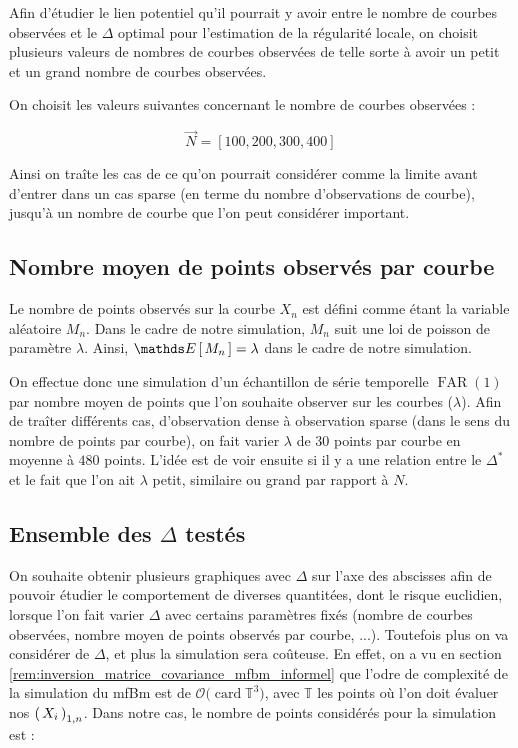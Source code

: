 Afin d'étudier le lien potentiel qu'il pourrait y avoir entre le nombre de courbes observées et le $\Delta$ optimal pour l'estimation de la régularité locale, on choisit plusieurs valeurs de nombres de courbes observées de telle sorte à avoir un \og petit \fg et un \og grand \fg nombre de courbes observées.

On choisit les valeurs suivantes concernant le nombre de courbes observées :

$$
	\vec N = [ 100, 200, 300, 400]
$$

Ainsi on traîte les cas de ce qu'on pourrait considérer comme la limite avant d'entrer dans un cas \og sparse \fg (en terme du nombre d'observations de courbe), jusqu'à un nombre de courbe que l'on peut considérer important.

\subsection{Nombre moyen de points observés par courbe}

Le nombre de points observés sur la courbe $X_n$ est défini comme étant la variable aléatoire $M_n$. Dans le cadre de notre simulation, $M_n$ suit une loi de poisson de paramètre $\lambda$. Ainsi, $\esperance{M_n} = \lambda$ dans le cadre de notre simulation.

On effectue donc une simulation d'un échantillon de série temporelle $\operatorname{FAR}(1)$ par nombre moyen de points que l'on souhaite observer sur les courbes ($\lambda$). Afin de traîter différents cas, d'observation \og dense \fg à observation \og sparse \fg (dans le sens du nombre de points par courbe), on fait varier $\lambda$ de $30$ points par courbe en moyenne à $480$ points. L'idée est de voir ensuite si il y a une relation entre le $\Delta^*$ et le fait que l'on ait $\lambda$ petit, similaire ou grand par rapport à $N$.

\subsection{Ensemble des $\Delta$ testés}

On souhaite obtenir plusieurs graphiques avec $\Delta$ sur l'axe des abscisses afin de pouvoir étudier le comportement de diverses quantitées, dont le risque euclidien, lorsque l'on fait varier $\Delta$ avec certains paramètres fixés (nombre de courbes observées, nombre moyen de points observés par courbe, ...). Toutefois plus on va considérer de $\Delta$, et plus la simulation sera coûteuse. En effet, on a vu en section \ref{rem:inversion_matrice_covariance_mfbm_informel} que l'odre de complexité de la simulation du mfBm est de $\mathcal O \bigl( \operatorname{card} \mathds T^3 \bigr)$, avec $\mathds T$ les points où l'on doit évaluer nos $\left( \, {X} _ {i} \, \right)_{1, n}$. Dans notre cas, le nombre de points considérés pour la simulation est :

